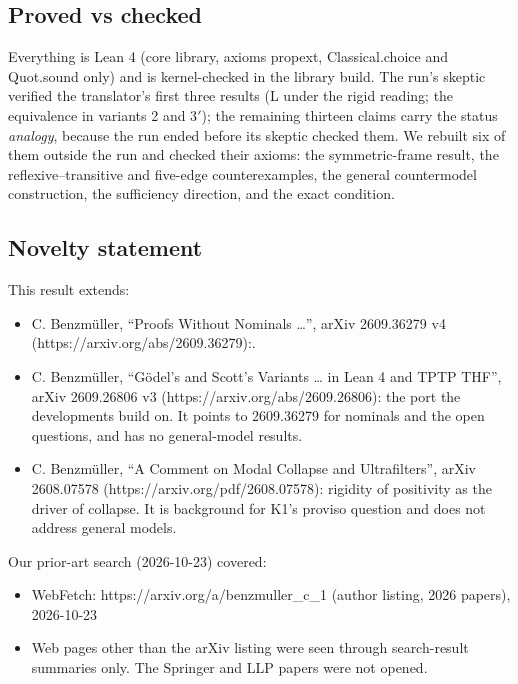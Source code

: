 \documentclass{article}
\begin{document}
\subsection*{Proved vs checked}

Everything is Lean 4 (core library, axioms propext, Classical.choice and Quot.sound only) and is
kernel-checked in the library build. The run's skeptic verified the translator's first three
results (L under the rigid reading; the equivalence in variants 2 and 3$'$); the remaining
thirteen claims carry the status \emph{analogy}, because the run ended before its skeptic checked
them. We rebuilt six of them outside the run and checked their axioms: the symmetric-frame result,
the reflexive--transitive and five-edge counterexamples, the general countermodel construction,
the sufficiency direction, and the exact condition.

\subsection*{Novelty statement}

This result extends:

\begin{itemize}
\item C. Benzmüller, ``Proofs Without Nominals \ldots{}'', arXiv 2609.36279 v4 (https://arxiv.org/abs/2609.36279):.
\item C. Benzmüller, ``Gödel's and Scott's Variants \ldots{} in Lean 4 and TPTP THF'', arXiv 2609.26806 v3 (https://arxiv.org/abs/2609.26806): the port the developments build on. It points to 2609.36279 for nominals and the open questions, and has no general-model results.
\item C. Benzmüller, ``A Comment on Modal Collapse and Ultrafilters'', arXiv 2608.07578 (https://arxiv.org/pdf/2608.07578): rigidity of positivity as the driver of collapse. It is background for K1's proviso question and does not address general models.
\end{itemize}

Our prior-art search (2026-10-23) covered:

\begin{itemize}
\item WebFetch: https://arxiv.org/a/benzmuller\_c\_1 (author listing, 2026 papers), 2026-10-23
\item Web pages other than the arXiv listing were seen through search-result summaries only. The Springer and LLP papers were not opened.
\end{itemize}
\end{document}
